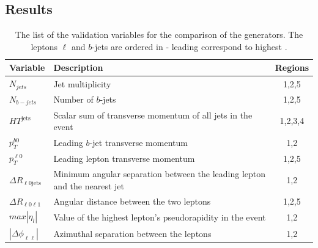 \subsection{Results}
\begin{table}[]
\begin{center}
\caption{\label{tab:ttw_varlist}
The list of the validation variables for the comparison of the \ttW generators. The leptons $\ell$ and $b$-jets are ordered in \pt - leading correspond to highest \pt. }
\vspace{0.25cm}
{\small
\setlength\tabcolsep{1.5pt}
\begin{tabular}{l|l|c}
\hline\hline
Variable & Description & Regions \\ \hline
$N_{jets}$   &     Jet multiplicity        &      1,2,5   \\ %
 $N_{b-jets}$       &     Number of  $b$-jets       &   1,2,5      \\ %
$HT^{\text{jets}}$      & Scalar sum of transverse momentum of all jets in the event         &  1,2,3,4       \\ %
$p_T^{b0}$       &      Leading $b$-jet transverse momentum       &   1,2      \\ %
 $p_T^{\ell 0}$      &   Leading lepton transverse momentum           &     1,2,5    \\ %
$\Delta R _{ \ell 0\mathrm{jets} }$      &     Minimum angular separation between the leading lepton and the nearest jet         &  1,2       \\ %
$\Delta R _{\ell 0\ell1 }$      &       Angular distance between the two leptons      &    1,2,5    \\ %
$max |\eta _l|$      &    Value of the highest lepton's pseudorapidity in the event        &     1,2    \\ %
    $|\Delta \phi _{\ell \ell }|$    &    Azimuthal separation between the leptons         & 1,2    \\
    \hline\hline    
\end{tabular}
}
\end{center}
\end{table}



